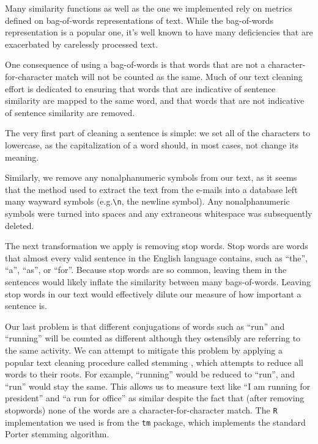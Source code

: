 Many similarity functions \cite{textrank-sim-var} as well as the one we implemented rely on metrics defined on bag-of-words representations of text.
While the bag-of-words representation is a popular one, it's well known to have many deficiencies that are exacerbated by carelessly processed text.

One consequence of using a bag-of-words is that words that are not a character-for-character match will not be counted as the same.
Much of our text cleaning effort is dedicated to ensuring that words that are indicative of sentence similarity are mapped to the same word, and that words that are not indicative of sentence similarity are removed.

The very first part of cleaning a sentence is simple: we set all of the characters to lowercase, as the capitalization of a word should, in most cases, not change its meaning.

Similarly, we remove any nonalphanumeric symbols from our text, as it seems that the method used to extract the text from the e-mails into a database left many wayward symbols (e.g.\verb!\n!, the newline symbol).
Any nonalphanumeric symbols were turned into spaces and any extraneous whitespace was subsequently deleted.

The next transformation we apply is removing stop words.
Stop words are words that almost every valid sentence in the English language contains, such as ``the'', ``a'', ``as'', or ``for''.
Because stop words are so common, leaving them in the sentences would likely inflate the similarity between many bags-of-words.
Leaving stop words in our text would effectively dilute our measure of how important a sentence is.

Our last problem is that different conjugations of words such as ``run'' and ``running'' will be counted as different although they ostensibly are referring to the same activity.
We can attempt to mitigate this problem by applying a popular text cleaning procedure called stemming \cite{willett2006porter}, which attempts to reduce all words to their roots.
For example, ``running'' would be reduced to ``run'', and ``run'' would stay the same.
This allows us to measure text like ``I am running for president'' and ``a run for office'' as similar despite the fact that (after removing stopwords) none of the words are a character-for-character match.
The \texttt{R} implementation we used is from the \texttt{tm} package, which implements the standard Porter stemming algorithm.
